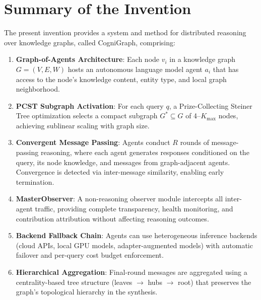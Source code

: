 \documentclass[a4paper,12pt]{article}
\begin{document}
\vspace{4mm}


\section*{Summary of the Invention}

\noindent The present invention provides a system and method for distributed reasoning over knowledge graphs, called CogniGraph, comprising:

\begin{enumerate}[nosep,leftmargin=2em]
\item \textbf{Graph-of-Agents Architecture}: Each node $v_i$ in a knowledge graph $G = (V, E, W)$ hosts an autonomous language model agent $a_i$ that has access to the node's knowledge content, entity type, and local graph neighborhood.

\item \textbf{PCST Subgraph Activation}: For each query $q$, a Prize-Collecting Steiner Tree optimization selects a compact subgraph $G^* \subseteq G$ of 4--$K_{\max}$ nodes, achieving sublinear scaling with graph size.

\item \textbf{Convergent Message Passing}: Agents conduct $R$ rounds of message-passing reasoning, where each agent generates responses conditioned on the query, its node knowledge, and messages from graph-adjacent agents. Convergence is detected via inter-message similarity, enabling early termination.

\item \textbf{MasterObserver}: A non-reasoning observer module intercepts all inter-agent traffic, providing complete transparency, health monitoring, and contribution attribution without affecting reasoning outcomes.

\item \textbf{Backend Fallback Chain}: Agents can use heterogeneous inference backends (cloud APIs, local GPU models, adapter-augmented models) with automatic failover and per-query cost budget enforcement.

\item \textbf{Hierarchical Aggregation}: Final-round messages are aggregated using a centrality-based tree structure (leaves $\to$ hubs $\to$ root) that preserves the graph's topological hierarchy in the synthesis.
\end{enumerate}
\end{document}
